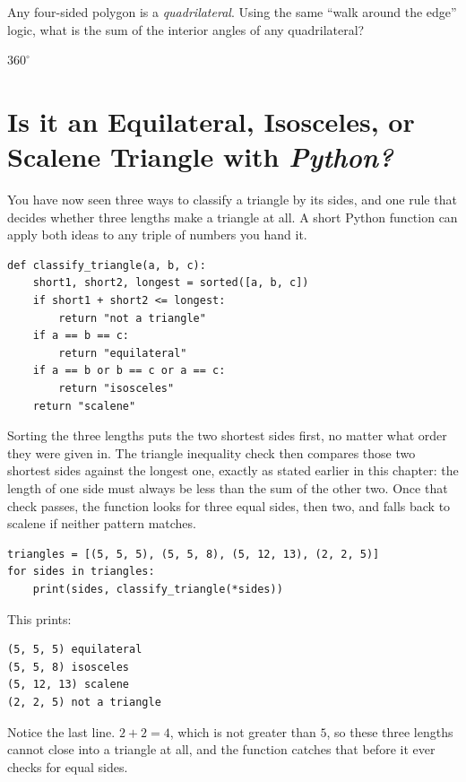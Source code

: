 \begin{Exercise}[title={Interior Angles of a Quadrilateral}, label=interior_of_quad]
  Any four-sided polygon is a \emph{quadrilateral}. Using the same
  ``walk around the edge'' logic, what is the sum of the interior
  angles of any quadrilateral?
\end{Exercise}
\begin{Answer}[ref=interior_of_quad]
$360^\circ$
\end{Answer}


\section{Is it an Equilateral, Isosceles, or Scalene Triangle with \textit{Python?}}

You have now seen three ways to classify a triangle by its sides, and one rule that decides whether three lengths make a triangle at all. A short Python function can apply both ideas to any triple of numbers you hand it.

\begin{verbatim}
def classify_triangle(a, b, c):
    short1, short2, longest = sorted([a, b, c])
    if short1 + short2 <= longest:
        return "not a triangle"
    if a == b == c:
        return "equilateral"
    if a == b or b == c or a == c:
        return "isosceles"
    return "scalene"
\end{verbatim}

Sorting the three lengths puts the two shortest sides first, no matter what order they were given in. The triangle inequality check then compares those two shortest sides against the longest one, exactly as stated earlier in this chapter: the length of one side must always be less than the sum of the other two. Once that check passes, the function looks for three equal sides, then two, and falls back to scalene if neither pattern matches.

\begin{verbatim}
triangles = [(5, 5, 5), (5, 5, 8), (5, 12, 13), (2, 2, 5)]
for sides in triangles:
    print(sides, classify_triangle(*sides))
\end{verbatim}

This prints:

\begin{verbatim}
(5, 5, 5) equilateral
(5, 5, 8) isosceles
(5, 12, 13) scalene
(2, 2, 5) not a triangle
\end{verbatim}

Notice the last line. $2 + 2 = 4$, which is not greater than $5$, so these three lengths cannot close into a triangle at all, and the function catches that before it ever checks for equal sides.

